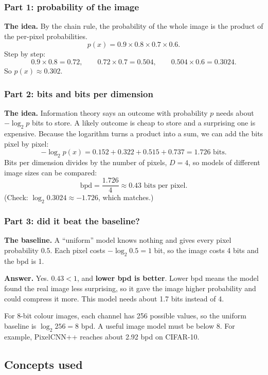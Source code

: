 \documentclass[12pt,a4paper]{article}
\begin{document}
\subsubsection{Part 1: probability of the image}

\textbf{The idea.} By the chain rule, the probability of the whole image is the product of the per-pixel probabilities.
\[
p(x) = 0.9 \times 0.8 \times 0.7 \times 0.6.
\]
Step by step:
\[
0.9 \times 0.8 = 0.72, \qquad 0.72 \times 0.7 = 0.504, \qquad 0.504 \times 0.6 = 0.3024.
\]
So $p(x) \approx 0.302$.

\subsubsection{Part 2: bits and bits per dimension}

\textbf{The idea.} Information theory says an outcome with probability $p$ needs about $-\log_2 p$ bits to store. A likely outcome is cheap to store and a surprising one is expensive. Because the logarithm turns a product into a sum, we can add the bits pixel by pixel:
\[
-\log_2 p(x) = 0.152 + 0.322 + 0.515 + 0.737 = 1.726 \text{ bits}.
\]
Bits per dimension divides by the number of pixels, $D = 4$, so models of different image sizes can be compared:
\[
\mathrm{bpd} = \frac{1.726}{4} \approx 0.43 \text{ bits per pixel}.
\]
(Check: $\log_2 0.3024 \approx -1.726$, which matches.)

\subsubsection{Part 3: did it beat the baseline?}

\textbf{The baseline.} A ``uniform'' model knows nothing and gives every pixel probability $0.5$. Each pixel costs $-\log_2 0.5 = 1$ bit, so the image costs 4 bits and the bpd is 1.

\textbf{Answer.} Yes. $0.43 < 1$, and \textbf{lower bpd is better}. Lower bpd means the model found the real image less surprising, so it gave the image higher probability and could compress it more. This model needs about 1.7 bits instead of 4.

For 8-bit colour images, each channel has 256 possible values, so the uniform baseline is $\log_2 256 = 8$ bpd. A useful image model must be below 8. For example, PixelCNN++ reaches about 2.92 bpd on CIFAR-10.

\subsection{Concepts used}
\end{document}
